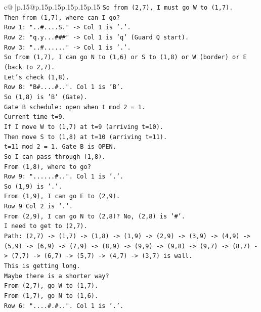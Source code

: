 \documentclass{article}
\begin{document}
{\begin{supertabular}{c@{$\;$}|p{.15\linewidth}@{}p{.15\linewidth}p{.15\linewidth}p{.15\linewidth}p{.15\linewidth}p{.15\linewidth}}
{{{\texttt{So from (2,7), I must go W to (1,7).} \\
\texttt{Then from (1,7), where can I go?} \\
\texttt{Row 1: "..\#....S." {-}> Col 1 is '.'.} \\
\texttt{Row 2: "q.y...\#\#\#" {-}> Col 1 is 'q' (Guard Q start).} \\
\texttt{Row 3: "..\#......" {-}> Col 1 is '.'.} \\
\texttt{So from (1,7), I can go N to (1,6) or S to (1,8) or W (border) or E (back to 2,7).} \\
\texttt{Let's check (1,8).} \\
\texttt{Row 8: "B\#....\#..". Col 1 is 'B'.} \\
\texttt{So (1,8) is 'B' (Gate).} \\
\texttt{Gate B schedule: open when t mod 2 = 1.} \\
\texttt{Current time t=9.} \\
\texttt{If I move W to (1,7) at t=9 (arriving t=10).} \\
\texttt{Then move S to (1,8) at t=10 (arriving t=11).} \\
\texttt{t=11 mod 2 = 1. Gate B is OPEN.} \\
\texttt{So I can pass through (1,8).} \\
\texttt{From (1,8), where to go?} \\
\texttt{Row 9: "......\#..". Col 1 is '.'.} \\
\texttt{So (1,9) is '.'.} \\
\texttt{From (1,9), I can go E to (2,9).} \\
\texttt{Row 9 Col 2 is '.'.} \\
\texttt{From (2,9), I can go N to (2,8)? No, (2,8) is '\#'.} \\
\texttt{I need to get to (2,7).} \\
\texttt{Path: (2,7) {-}> (1,7) {-}> (1,8) {-}> (1,9) {-}> (2,9) {-}> (3,9) {-}> (4,9) {-}> (5,9) {-}> (6,9) {-}> (7,9) {-}> (8,9) {-}> (9,9) {-}> (9,8) {-}> (9,7) {-}> (8,7) {-}> (7,7) {-}> (6,7) {-}> (5,7) {-}> (4,7) {-}> (3,7) is wall.} \\
\texttt{This is getting long.} \\
\texttt{Maybe there is a shorter way?} \\
\texttt{From (2,7), go W to (1,7).} \\
\texttt{From (1,7), go N to (1,6).} \\
\texttt{Row 6: "....\#.\#..". Col 1 is '.'.} \\
}}}
\end{supertabular}}
\end{document}
